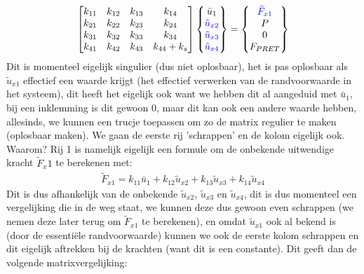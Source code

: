 \documentclass[a4paper,11pt,twoside]{report}
\begin{document}
\begin{align*}
    \begin{bmatrix}
        k_{11} & k_{12} & k_{13} & k_{14}       \\
        k_{21} & k_{22} & k_{23} & k_{24}       \\
        k_{31} & k_{32} & k_{33} & k_{34}       \\
        k_{41} & k_{42} & k_{43} & k_{44} + k_s
    \end{bmatrix}
    \begin{Bmatrix}
        \bar{u}_1                    \\
        {\color{blue}\tilde{u}_{x2}} \\
        {\color{blue}\tilde{u}_{x3}} \\
        {\color{blue}\tilde{u}_{x4}}
    \end{Bmatrix} =
    \begin{Bmatrix}
        {\color{blue}\tilde{F}_{x1}} \\
        P                            \\
        0                            \\
        F_{PRET}
    \end{Bmatrix}
\end{align*}
Dit is momenteel eigelijk singulier (dus niet oplosbaar), het is pas oplosbaar als $\tilde{u}_{x1}$
effectief een waarde krijgt (het effectief verwerken van de randvoorwaarde in het systeem), dit
heeft het eigelijk ook want we hebben dit al aangeduid met $\bar{u}_1$, bij een inklemming is dit
gewoon 0, maar dit kan ook een andere waarde hebben, allesinds, we kunnen een trucje toepassen om zo
de matrix regulier te maken (oplosbaar maken). We gaan de eerste rij 'schrappen' en de kolom
eigelijk ook. Waarom? Rij 1 is namelijk eigelijk een formule om de onbekende uitwendige kracht
$\tilde{F}_x1$ te berekenen met:
\begin{align*}
    \tilde{F}_{x1} = k_{11} \bar{u}_1 + k_{12} \tilde{u}_{x2} + k_{13} \tilde{u}_{x3} + k_{14} \tilde{u}_{x4}
\end{align*}
Dit is dus afhankelijk van de onbekende $\tilde{u}_{x2}$, $\tilde{u}_{x3}$ en $\tilde{u}_{x4}$, dit
is dus momenteel een vergelijking die in de weg staat, we kunnen deze dus gewoon even schrappen (we
nemen deze later terug om $\tilde{F}_{x1}$ te berekenen), en omdat $\tilde{u}_{x1}$ ook al bekend is
(door de essentiële randvoorwaarde) kunnen we ook de eerste kolom schrappen en dit eigelijk
aftrekken bij de krachten (want dit is een constante). Dit geeft dan de volgende matrixvergelijking:
\end{document}
